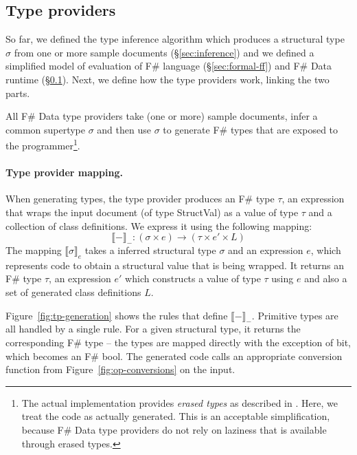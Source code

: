 \documentclass[10pt,preprint,clearpagebib]{sigplanconf}
\newcommand{\ident}[1]{\textnormal{\sffamily #1}}
\newcommand{\sem}[1]{\llbracket #1 \rrbracket}
\begin{document}

\subsection{Type providers}
\label{sec:formal-tp}

So far, we defined the type inference algorithm which produces a structural type $\sigma$ from one 
or more sample documents (\S\ref{sec:inference}) and we defined a simplified model of evaluation
of F\# language (\S\ref{sec:formal-ff}) and F\# Data runtime (\S\ref{sec:formal-tp}). Next, we 
define how the type providers work, linking the two parts.

All F\# Data type providers take (one or more) sample documents, infer a common supertype $\sigma$
and then use $\sigma$ to generate F\# types that are exposed to the programmer\footnote{The actual 
implementation provides \emph{erased types} as described in \cite{fsharp-typeprov}. Here, we treat 
the code as actually generated. This is an acceptable simplification, because F\# Data type providers 
do not rely on laziness that is available through erased types.}. 

\paragraph{Type provider mapping.}
When generating types, the type provider produces an F\# type $\tau$, an expression that wraps 
the input document (of type \ident{StructVal}) as a value of type $\tau$ and a collection of class 
definitions. We express it using the following mapping:
%
\begin{equation*}
\sem{-}_{-} : (\sigma\times e) \rightarrow (\tau \times e' \times L)
\end{equation*}
%
The mapping $\sem{\sigma}_e$ takes a inferred structural type $\sigma$ and an expression $e$, 
which represents code to obtain a structural value that is being wrapped. It returns an F\# type 
$\tau$, an expression $e'$ which constructs a value of type $\tau$ using $e$ and also a set of 
generated class definitions $L$.

Figure~\ref{fig:tp-generation} shows the rules that define $\sem{-}_{-}$. Primitive types are all
handled by a single rule. For a given structural type, it returns the corresponding F\# type -- the types are
mapped directly with the exception of \ident{bit}, which becomes an F\# \ident{bool}. The generated code calls
an appropriate conversion function from Figure~\ref{fig:op-conversions} on the input.
\end{document}
